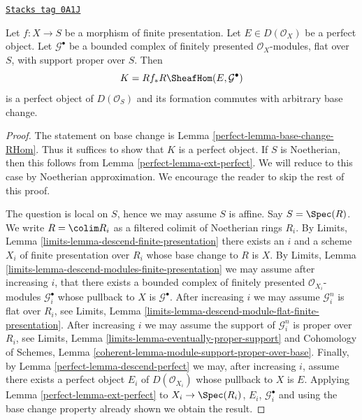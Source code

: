 \begin{lemma}
\label{perfect-lemma-base-change-RHom-perfect}
\href{https://stacks.math.columbia.edu/tag/0A1J}{\texttt{Stacks tag 0A1J}}

Let $f : X \to S$ be a morphism of finite presentation.
Let $E \in D(\mathcal{O}_X)$ be a perfect object. Let $\mathcal{G}^\bullet$
be a bounded complex of finitely presented $\mathcal{O}_X$-modules,
flat over $S$, with support proper over $S$. Then
$$
K = Rf_*R\SheafHom(E, \mathcal{G}^\bullet)
$$
is a perfect object of $D(\mathcal{O}_S)$ and its formation
commutes with arbitrary base change.
\end{lemma}

\begin{proof}

The statement on base change is Lemma \ref{perfect-lemma-base-change-RHom}.
Thus it suffices to show that $K$ is a perfect object. If $S$ is
Noetherian, then this follows from
Lemma \ref{perfect-lemma-ext-perfect}.
We will reduce to this case by Noetherian approximation.
We encourage the reader to skip the rest of this proof.

\medskip\noindent
The question is local on $S$, hence we may assume $S$ is affine.
Say $S = \Spec(R)$. We write $R = \colim R_i$ as a filtered colimit
of Noetherian rings $R_i$. By Limits, Lemma
\ref{limits-lemma-descend-finite-presentation}
there exists an $i$ and a scheme $X_i$ of finite presentation over $R_i$
whose base change to $R$ is $X$. By
Limits, Lemma \ref{limits-lemma-descend-modules-finite-presentation}
we may assume after increasing $i$, that there exists a bounded complex
of finitely presented $\mathcal{O}_{X_i}$-modules $\mathcal{G}_i^\bullet$
whose pullback to $X$ is $\mathcal{G}^\bullet$. After increasing $i$
we may assume $\mathcal{G}_i^n$ is flat over $R_i$, see
Limits, Lemma \ref{limits-lemma-descend-module-flat-finite-presentation}.
After increasing $i$ we may assume the support of $\mathcal{G}_i^n$
is proper over $R_i$, see
Limits, Lemma \ref{limits-lemma-eventually-proper-support} and
Cohomology of Schemes, Lemma
\ref{coherent-lemma-module-support-proper-over-base}.
Finally, by Lemma \ref{perfect-lemma-descend-perfect}
we may, after increasing $i$, assume there exists a perfect
object $E_i$ of $D(\mathcal{O}_{X_i})$ whose pullback to
$X$ is $E$. Applying Lemma \ref{perfect-lemma-ext-perfect}
to $X_i \to \Spec(R_i)$, $E_i$, $\mathcal{G}_i^\bullet$ and using the
base change property already shown we obtain the result.
\end{proof}

